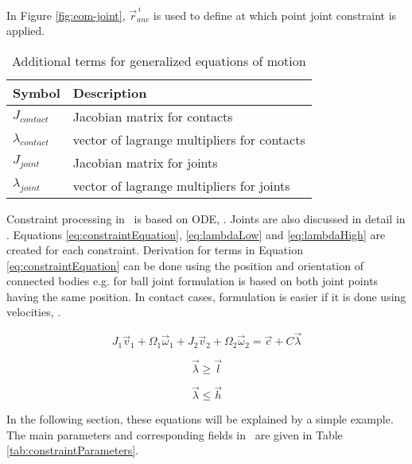 In Figure \ref{fig:eom-joint}, $\vec{r}_{anc}^{\,i}$ is used to define at which point
joint constraint is applied.

\begin {table}[htb!]
\caption {Additional terms  for generalized equations of motion}
\label{tab:eom-g}
\begin{center}
\begin{tabular}{|l| l|}
\hline
{\bf Symbol} & {\bf Description} \\  \hline
$J_{contact}$ & Jacobian matrix for contacts  \\ \hline
$\lambda_{contact}$ & vector of lagrange multipliers for contacts  \\ \hline
$J_{joint}$ & Jacobian matrix for joints  \\ \hline
$\lambda_{joint}$ & vector of lagrange multipliers for joints  \\ \hline
\end {tabular}
\end{center}
\end {table}

Constraint processing in \bullet\ is based on ODE, \cite{ode}.
Joints are also discussed in detail in  
\citet{erleben.thesis}.
Equations \ref{eq:constraintEquation}, \ref{eq:lambdaLow} and
\ref{eq:lambdaHigh} 
are created for each constraint. 
Derivation for terms in Equation \ref{eq:constraintEquation}
can be done using the position and orientation of connected bodies
e.g. for ball joint formulation is based on both joint points having the same position.
In contact cases, formulation is easier if it is done using velocities, \cite{ode.joints}.

\begin{equation} \label{eq:constraintEquation}
J_1 \vec{v}_1 + \Omega_1 \vec{\omega}_1 + 
J_2 \vec{v}_2 + \Omega_2 \vec{\omega}_2 = \vec{c} + C \vec{\lambda}
\end{equation}

\begin{equation} \label{eq:lambdaLow}
\vec{\lambda} \geq \vec{l}
\end{equation}

\begin{equation} \label{eq:lambdaHigh}
\vec{\lambda} \leq \vec{h}
\end{equation}

In the following section, these equations will be explained by a simple example.
The main parameters  and corresponding fields in \bullet\  
are given in Table \ref{tab:constraintParameters}.

